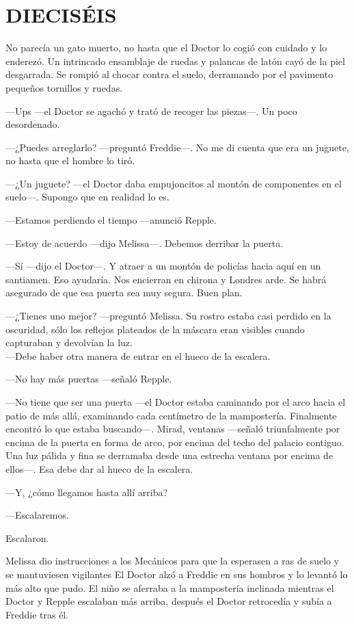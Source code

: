 \chapter*{DIECISÉIS}

{No parecía un gato muerto, no hasta que el Doctor lo cogió con cuidado
	y lo enderezó. Un intrincado ensamblaje de ruedas y palancas de
	latón cayó de la piel desgarrada. Se rompió al chocar contra el
suelo, derramando por el pavimento pequeños tornillos y ruedas.}

{---Ups ---el Doctor se agachó y trató de recoger las piezas---. Un
poco desordenado.}

{---¿Puedes arreglarlo? ---preguntó Freddie---. No me di cuenta que
era un juguete, no hasta que el hombre lo tiró.}

{---¿Un juguete? ---el Doctor daba empujoncitos al montón de componentes
en el suelo---. Supongo que en realidad lo es.}

{---Estamos perdiendo el tiempo ---anunció Repple.}

{---Estoy de acuerdo ---dijo Melissa---. Debemos derribar la
puerta.}

{---Sí ---dijo el Doctor---. Y atraer a un montón de policías hacia
	aquí en un santiamen. Eso ayudaría. Nos encierran en chirona y
	Londres arde. Se habrá asegurado de que esa puerta sea muy
segura. Buen plan.}

{---¿Tienes uno mejor? ---preguntó Melissa. Su rostro estaba casi
	perdido en la oscuridad, sólo los reflejos plateados de la máscara eran
	visibles cuando capturaban y devolvían la luz.\\
---Debe haber otra manera de entrar en el hueco de la escalera.}

{---No hay más puertas ---señaló Repple.}

{---No tiene que ser una puerta ---el Doctor estaba caminando por el
	arco hacia el patio de más allá, examinando cada centímetro de la
	mampostería. Finalmente encontró lo que estaba
	buscando---. Mirad, ventanas ---señaló triunfalmente por encima de
	la puerta en forma de arco, por encima del techo del palacio
	contiguo. Una luz pálida y fina se derramaba desde una estrecha
	ventana por encima de ellos---. Esa debe dar al hueco de la
escalera.}

{---Y, ¿cómo llegamos hasta allí arriba?}

{---Escalaremos.}

{Escalaron.}

{Melissa dio instrucciones a los Mecánicos para que la esperasen a ras
	de suelo y se mantuviesen vigilantes El Doctor alzó a Freddie en sus
	hombros y lo levantó lo más alto que pudo. El niño se aferraba a la
	mampostería inclinada mientras el Doctor y Repple escalaban más arriba,
después el Doctor retrocedía y subía a Freddie tras él.}

